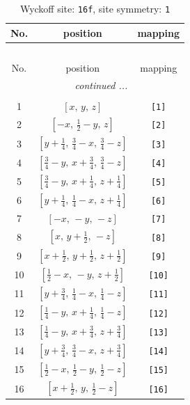 \documentclass[fleqn,8pt]{jsarticle}
\begin{document}
\begin{longtable}{ccc}
\caption{Wyckoff site: {\tt 16f}, site symmetry: {\tt 1}}
 \\
 \hline \hline
No. & position & mapping \\ \hline \endfirsthead

\multicolumn{2}{l}{\tablename\ \thetable{}} \\
 \hline \hline
No. & position & mapping \\ \hline \endhead

 \hline \hline
\multicolumn{2}{r}{\footnotesize\it continued ...} \\ \endfoot

 \hline \hline
\multicolumn{2}{r}{} \\ \endlastfoot

1 & $\left[ x,\, y,\, z \right]$ & {\tt [1]} \\ \hline
2 & $\left[ - x,\, \frac{1}{2} - y,\, z \right]$ & {\tt [2]} \\ \hline
3 & $\left[ y + \frac{1}{4},\, \frac{3}{4} - x,\, \frac{3}{4} - z \right]$ & {\tt [3]} \\ \hline
4 & $\left[ \frac{3}{4} - y,\, x + \frac{3}{4},\, \frac{3}{4} - z \right]$ & {\tt [4]} \\ \hline
5 & $\left[ \frac{3}{4} - y,\, x + \frac{1}{4},\, z + \frac{1}{4} \right]$ & {\tt [5]} \\ \hline
6 & $\left[ y + \frac{1}{4},\, \frac{1}{4} - x,\, z + \frac{1}{4} \right]$ & {\tt [6]} \\ \hline
7 & $\left[ - x,\, - y,\, - z \right]$ & {\tt [7]} \\ \hline
8 & $\left[ x,\, y + \frac{1}{2},\, - z \right]$ & {\tt [8]} \\ \hline
9 & $\left[ x + \frac{1}{2},\, y + \frac{1}{2},\, z + \frac{1}{2} \right]$ & {\tt [9]} \\ \hline
10 & $\left[ \frac{1}{2} - x,\, - y,\, z + \frac{1}{2} \right]$ & {\tt [10]} \\ \hline
11 & $\left[ y + \frac{3}{4},\, \frac{1}{4} - x,\, \frac{1}{4} - z \right]$ & {\tt [11]} \\ \hline
12 & $\left[ \frac{1}{4} - y,\, x + \frac{1}{4},\, \frac{1}{4} - z \right]$ & {\tt [12]} \\ \hline
13 & $\left[ \frac{1}{4} - y,\, x + \frac{3}{4},\, z + \frac{3}{4} \right]$ & {\tt [13]} \\ \hline
14 & $\left[ y + \frac{3}{4},\, \frac{3}{4} - x,\, z + \frac{3}{4} \right]$ & {\tt [14]} \\ \hline
15 & $\left[ \frac{1}{2} - x,\, \frac{1}{2} - y,\, \frac{1}{2} - z \right]$ & {\tt [15]} \\ \hline
16 & $\left[ x + \frac{1}{2},\, y,\, \frac{1}{2} - z \right]$ & {\tt [16]} \\
\end{longtable}
\end{document}
